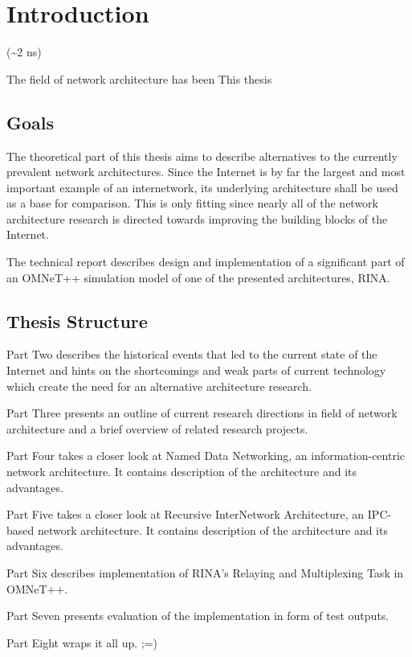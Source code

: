 
\chapter{Introduction}
    (\textasciitilde2 ns)

    The field of network architecture has been
    This thesis

    \section{Goals}
        The theoretical part of this thesis aims to describe alternatives to the currently prevalent network architectures. Since the Internet is by far the largest and most important example of an internetwork, its underlying architecture shall be used as a base for comparison. This is only fitting since nearly all of the network architecture research is directed towards improving the building blocks of the Internet.

        The technical report describes design and implementation of a significant part of an OMNeT++ simulation model of one of the presented architectures, RINA.

    \section{Thesis Structure}

        Part Two describes the historical events that led to the current state of the Internet and hints on the shortcomings and weak parts of current technology which create the need for an alternative architecture research.

        Part Three presents an outline of current research directions in field of network architecture and a brief overview of related research projects.

        Part Four takes a closer look at Named Data Networking, an information-centric network architecture. It contains description of the architecture and its advantages.

        Part Five takes a closer look at Recursive InterNetwork Architecture, an IPC-based network architecture. It contains description of the architecture and its advantages.

        Part Six describes implementation of RINA's Relaying and Multiplexing Task in OMNeT++.

        Part Seven presents evaluation of the implementation in form of test outputs.

        Part Eight wraps it all up. ;=)

